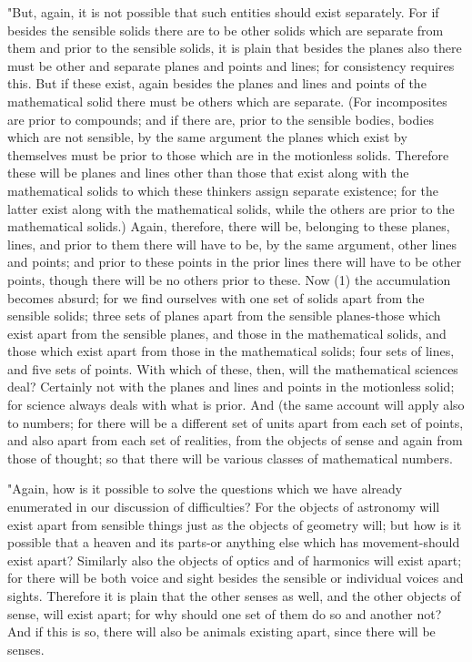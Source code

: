 "But, again, it is not possible that such entities should exist separately.
For if besides the sensible solids there are to be other solids which
are separate from them and prior to the sensible solids, it is plain
that besides the planes also there must be other and separate planes
and points and lines; for consistency requires this. But if these
exist, again besides the planes and lines and points of the mathematical
solid there must be others which are separate. (For incomposites are
prior to compounds; and if there are, prior to the sensible bodies,
bodies which are not sensible, by the same argument the planes which
exist by themselves must be prior to those which are in the motionless
solids. Therefore these will be planes and lines other than those
that exist along with the mathematical solids to which these thinkers
assign separate existence; for the latter exist along with the mathematical
solids, while the others are prior to the mathematical solids.) Again,
therefore, there will be, belonging to these planes, lines, and prior
to them there will have to be, by the same argument, other lines and
points; and prior to these points in the prior lines there will have
to be other points, though there will be no others prior to these.
Now (1) the accumulation becomes absurd; for we find ourselves with
one set of solids apart from the sensible solids; three sets of planes
apart from the sensible planes-those which exist apart from the sensible
planes, and those in the mathematical solids, and those which exist
apart from those in the mathematical solids; four sets of lines, and
five sets of points. With which of these, then, will the mathematical
sciences deal? Certainly not with the planes and lines and points
in the motionless solid; for science always deals with what is prior.
And (the same account will apply also to numbers; for there will be
a different set of units apart from each set of points, and also apart
from each set of realities, from the objects of sense and again from
those of thought; so that there will be various classes of mathematical
numbers. 

"Again, how is it possible to solve the questions which we have already
enumerated in our discussion of difficulties? For the objects of astronomy
will exist apart from sensible things just as the objects of geometry
will; but how is it possible that a heaven and its parts-or anything
else which has movement-should exist apart? Similarly also the objects
of optics and of harmonics will exist apart; for there will be both
voice and sight besides the sensible or individual voices and sights.
Therefore it is plain that the other senses as well, and the other
objects of sense, will exist apart; for why should one set of them
do so and another not? And if this is so, there will also be animals
existing apart, since there will be senses. 

